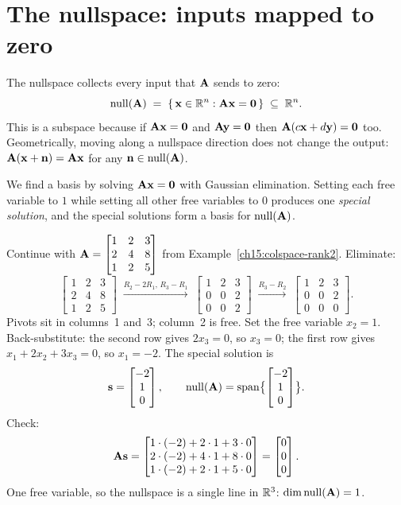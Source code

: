 \section{The nullspace: inputs mapped to zero}

The nullspace collects every input that $\mat{A}$ sends to zero:
\[
  \nullsp(\mat{A}) \;=\; \set{\,\vec{x}\in\R^n : \mat{A}\vec{x}=\vec{0}\,} \;\subseteq\; \R^n.
\]
This is a subspace because if $\mat{A}\vec{x}=\vec{0}$ and $\mat{A}\vec{y}=\vec{0}$ then
$\mat{A}(c\vec{x}+d\vec{y})=\vec{0}$ too. Geometrically, moving along a nullspace
direction does not change the output: $\mat{A}(\vec{x} + \vec{n}) = \mat{A}\vec{x}$
for any $\vec{n} \in \nullsp(\mat{A})$.

We find a basis by solving $\mat{A}\vec{x}=\vec{0}$ with Gaussian elimination.
Setting each free variable to $1$ while setting all other free variables to $0$
produces one \emph{special solution}, and the special solutions form a basis for
$\nullsp(\mat{A})$.

\begin{example}\label{ch15:nullspace-special}
Continue with $\mat{A}=\begin{bmatrix}1&2&3\\2&4&8\\1&2&5\end{bmatrix}$ from
Example~\ref{ch15:colspace-rank2}. Eliminate:
\[
  \begin{bmatrix}1&2&3\\2&4&8\\1&2&5\end{bmatrix}
  \;\xrightarrow{R_2-2R_1,\,R_3-R_1}\;
  \begin{bmatrix}1&2&3\\0&0&2\\0&0&2\end{bmatrix}
  \;\xrightarrow{R_3-R_2}\;
  \begin{bmatrix}1&2&3\\0&0&2\\0&0&0\end{bmatrix}.
\]
Pivots sit in columns~1 and~3; column~2 is free. Set the free variable $x_2 = 1$. Back-substitute:
the second row gives $2x_3=0$, so $x_3=0$; the first row gives $x_1+2x_2+3x_3=0$, so $x_1=-2$. The
special solution is
\[
  \vec{s} = \colvec{-2\\1\\0},
  \qquad
  \nullsp(\mat{A}) = \spn\set[\big]{\colvec{-2\\1\\0}}.
\]
Check:
\[
  \mat{A}\vec{s}=\colvec{1\cdot(-2)+2\cdot1+3\cdot0\\ 2\cdot(-2)+4\cdot1+8\cdot0\\
  1\cdot(-2)+2\cdot1+5\cdot0}=\colvec{0\\0\\0}.
\]
One free variable, so the nullspace is a single
line in $\R^3$: $\dimn\nullsp(\mat{A})=1$.
\end{example}

